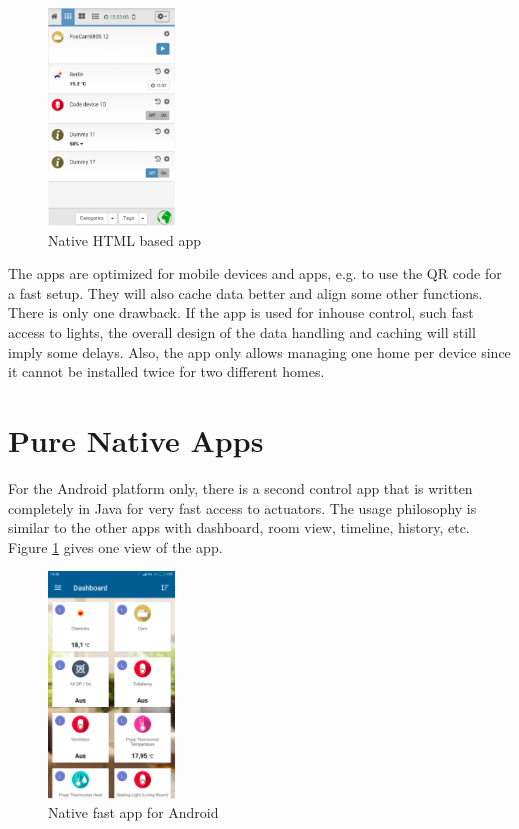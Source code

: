 \begin{figure}
\begin{center}
\includegraphics[width=0.3\textwidth]{pngs/cap5/mobile3.png}
\caption{Native HTML based app}
\label{mobile3}
\end{center}
\end{figure}

The apps are optimized for mobile devices and apps, e.g. to use the QR code for a fast 
setup. They will also cache data better and align some other functions.
There is only one drawback. If the app is used for inhouse control, such fast access to 
lights, the overall design of the data handling and caching will still imply some delays. 
Also, the app only allows managing one home per device since it cannot be installed twice 
for two different homes.

\section{Pure Native Apps}

For the Android platform only, there is a second \zway control app that is written 
completely in Java for very fast access to actuators. The usage philosophy is similar to 
the other apps with dashboard, room view, timeline, history, etc. Figure \ref{mobile3} 
gives one view of the app.

\begin{figure}
\begin{center}
\includegraphics[width=0.3\textwidth]{pngs/cap5/mobile5.png}
\caption{Native fast app for Android}
\label{mobile5}
\end{center}
\end{figure}

